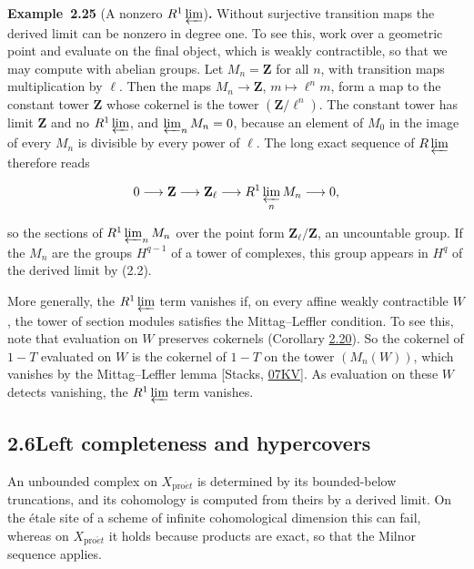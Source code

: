 \documentclass[11pt]{article}
\newenvironment{bpstatement}[2]{\par\addvspace{0.6\baselineskip}\noindent\textbf{#1}#2\textbf{.}\enspace\ignorespaces}
  {\par\addvspace{0.4\baselineskip}}
\begin{document}
\label{bp71}%
\begin{bpstatement}{Example~2.25}{ (A nonzero $R^1\varprojlim$)}
Without surjective transition maps the derived limit can be nonzero in degree one. To see this, work over a geometric point and evaluate on the final object, which is weakly contractible, so that we may compute with abelian groups. Let \(M_n=\mathbf Z\) for all \(n\), with transition maps multiplication by \(\ell\). Then the maps \(M_n\to\mathbf Z\), \(m\mapsto\ell^nm\), form a map to the constant tower \(\mathbf Z\) whose cokernel is the tower \((\mathbf Z/\ell^n)\). The constant tower has limit \(\mathbf Z\) and no \(R^1\varprojlim\), and \(\varprojlim_nM_n=0\), because an element of \(M_0\) in the image of every \(M_n\) is divisible by every power of \(\ell\). The long exact sequence of \(R\varprojlim\) therefore reads

\[
0\longrightarrow\mathbf Z\longrightarrow\mathbf Z_\ell\longrightarrow R^1\varprojlim_nM_n\longrightarrow0,
\]

so the sections of \(R^1\varprojlim_nM_n\) over the point form \(\mathbf Z_\ell/\mathbf Z\), an uncountable group. If the \(M_n\) are the groups \(H^{q-1}\) of a tower of complexes, this group appears in \(H^q\) of the derived limit by (2.2).
\end{bpstatement}

\label{bp72}%
More generally, the \(R^1\varprojlim\) term vanishes if, on every affine weakly contractible \(W\), the tower of section modules satisfies the Mittag–Leffler condition. To see this, note that evaluation on \(W\) preserves cokernels (Corollary \hyperref[bp57]{2.20}). So the cokernel of \(1-T\) evaluated on \(W\) is the cokernel of \(1-T\) on the tower \((M_n(W))\), which vanishes by the Mittag–Leffler lemma [Stacks, \href{https://stacks.math.columbia.edu/tag/07KV}{07KV}]. As evaluation on these \(W\) detects vanishing, the \(R^1\varprojlim\) term vanishes.


\subsection*{\texorpdfstring{2.6\quad Left completeness and hypercovers}{2.6 Left completeness and hypercovers}}
\label{bp73}%
\label{bp74}%
An unbounded complex on \(X_{\mathrm{pro}\acute{e}t}\) is determined by its bounded-below truncations, and its cohomology is computed from theirs by a derived limit. On the étale site of a scheme of infinite cohomological dimension this can fail, whereas on \(X_{\mathrm{pro}\acute{e}t}\) it holds because products are exact, so that the Milnor sequence applies.
\end{document}
